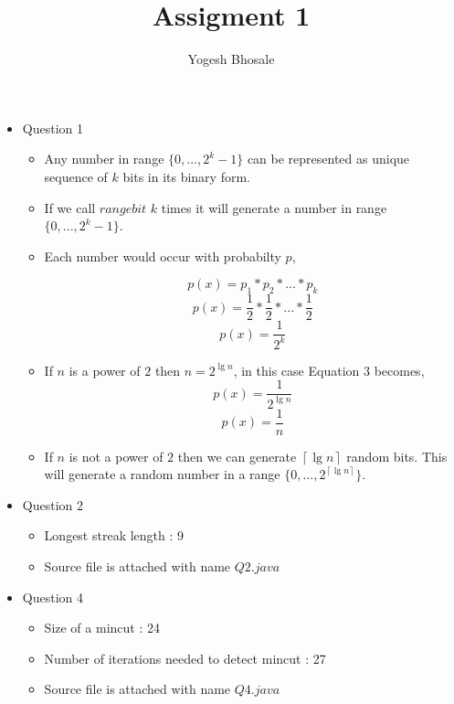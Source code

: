 \documentclass{article}
\begin{document}
\title{Assigment 1}
\author{Yogesh Bhosale}

\maketitle

\begin{itemize}


\item Question 1
\begin{itemize}
\item Any number in range $\{0,...,2^{k}-1\}$ can be represented as unique sequence of $k$
bits in its binary form.
\item If we call $rangebit$ $k$ times it will generate a number in range $\{0,...,2^{k}-1\}$.
\item Each number would occur with probabilty $p$,
\begin{flushleft}
\begin{equation}
    p(x) = p_1*p_2*...*p_k
\end{equation}
\begin{equation}
    p(x) = \frac{1}{2} * \frac{1}{2} *...*\frac{1}{2}
\end{equation}
\begin{equation}
    p(x) = \frac{1}{2^{k}}
\end{equation}
\end{flushleft}
\item If $n$ is a power of $2$ then $n=2^{ \lg n }$, in this case Equation 3 becomes,
   \begin{equation}
    p(x) = \frac{1}{2^{\lg n}}
\end{equation}
\begin{equation}
    p(x) = \frac{1}{n}
\end{equation}
\item If $n$ is not a power of $2$ then we can generate $\left \lceil \lg n \right \rceil$ random bits. This will generate a random number in a range $\{0,...,2^{\left \lceil \lg n \right \rceil}\}$.
\end{itemize}



\item Question 2
\begin{itemize}
\item Longest streak length : 9 \linebreak
\item Source file is attached with name $Q2.java$
\end{itemize}



\item Question 4
\begin{itemize}
\item Size of a mincut : 24 \linebreak
\item Number of iterations needed to detect mincut : 27 \linebreak
\item Source file is attached with name $Q4.java$
\end{itemize}


\end{itemize}

\end{document}
